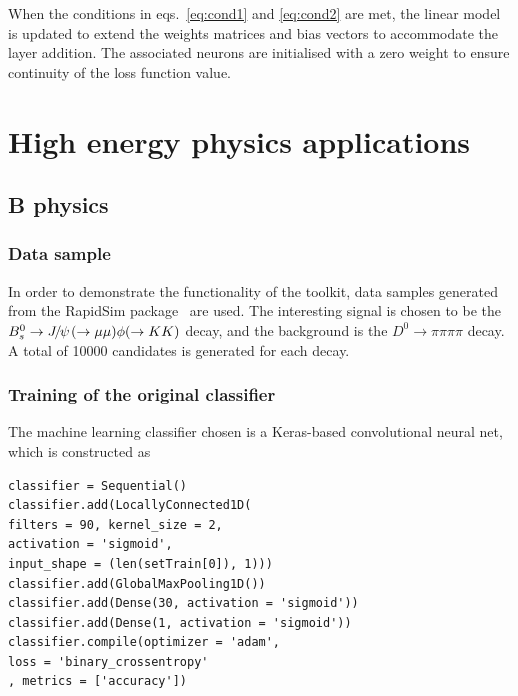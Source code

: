 \documentclass[final,5p,times,twocolumn]{elsarticle}
\def\Ppsi        {\ensuremath{\uppsi}\xspace}
\def\PB      {\ensuremath{\mathrm{B}}\xspace}
\def\PD      {\ensuremath{\mathrm{D}}\xspace}
\def\PJ      {\ensuremath{\mathrm{J}}\xspace}
\def\PK      {\ensuremath{\mathrm{K}}\xspace}
\def\Ps      {\ensuremath{\mathrm{s}}\xspace}
\def\Ppsi        {\ensuremath{\psi}\xspace}
\def\PB      {\ensuremath{B}\xspace}
\def\PD      {\ensuremath{D}\xspace}
\def\PJ      {\ensuremath{J}\xspace}
\def\PK      {\ensuremath{K}\xspace}
\def\Ps      {\ensuremath{s}\xspace}
\def\squark    {{\ensuremath{\Ps}}\xspace}
\def\D       {{\ensuremath{\PD}}\xspace}
\def\Dz      {{\ensuremath{\D^0}}\xspace}
\def\B       {{\ensuremath{\PB}}\xspace}
\def\Bs      {{\ensuremath{\B^0_\squark}}\xspace}
\def\jpsi     {{\ensuremath{{\PJ\mskip -3mu/\mskip -2mu\Ppsi\mskip 2mu}}}\xspace}
\def\to                 {\ensuremath{\rightarrow}\xspace}
\begin{document}
When the conditions in eqs.~\ref{eq:cond1} and \ref{eq:cond2} are met, the linear model
is updated to extend the weights matrices and bias vectors
to accommodate the layer addition.
The associated neurons are initialised with a zero weight
to ensure continuity of the loss function value.


\section{High energy physics applications}
\label{sec:hep}

\subsection{B physics}

\subsubsection{Data sample}

In order to demonstrate the functionality of the toolkit, data samples generated
from the RapidSim package~\cite{rapid} are used. The interesting signal is chosen
to be the $\Bs\to\jpsi(\to\mu\mu )\phi (\to\PK\PK )$ decay, and the background is
the $\Dz\to\pi\pi\pi\pi$ decay. A total of 10000 candidates is generated for each decay.

\subsubsection{Training of the original classifier}
\label{sec:orig_training}

The machine learning classifier chosen is a Keras-based convolutional neural net,
which is constructed as
\begin{lstlisting}
classifier = Sequential()
classifier.add(LocallyConnected1D(
filters = 90, kernel_size = 2,
activation = 'sigmoid',
input_shape = (len(setTrain[0]), 1)))
classifier.add(GlobalMaxPooling1D())
classifier.add(Dense(30, activation = 'sigmoid'))
classifier.add(Dense(1, activation = 'sigmoid'))
classifier.compile(optimizer = 'adam',
loss = 'binary_crossentropy'
, metrics = ['accuracy'])
\end{lstlisting}
\end{document}
